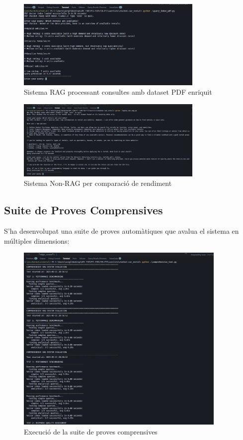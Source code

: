 \documentclass[12pt,a4paper]{article}
\begin{document}
\begin{figure}[H]
\centering
\includegraphics[width=0.8\textwidth]{img/query_index_pdf.png}
\caption{Sistema RAG processant consultes amb dataset PDF enriquit}
\end{figure}

\begin{figure}[H]
\centering
\includegraphics[width=0.8\textwidth]{img/query_non_rag.png}
\caption{Sistema Non-RAG per comparació de rendiment}
\end{figure}

\subsection{Suite de Proves Comprensives}

S'ha desenvolupat una suite de proves automàtiques que avalua el sistema en múltiples dimensions:

\begin{figure}[H]
\centering
\includegraphics[width=0.9\textwidth]{img/comprehensive_test.png}
\caption{Execució de la suite de proves comprensives}
\end{figure}
\end{document}
